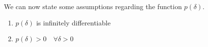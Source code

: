 \documentclass[12pt]{article}
\begin{document}
We can now state some assumptions regarding the function $p(\delta)$.
\begin{enumerate}
	\item $p(\delta)$ is infinitely differentiable
	\item $p(\delta)>0 \quad  \forall \delta >0$
\end{enumerate}





\end{document}
